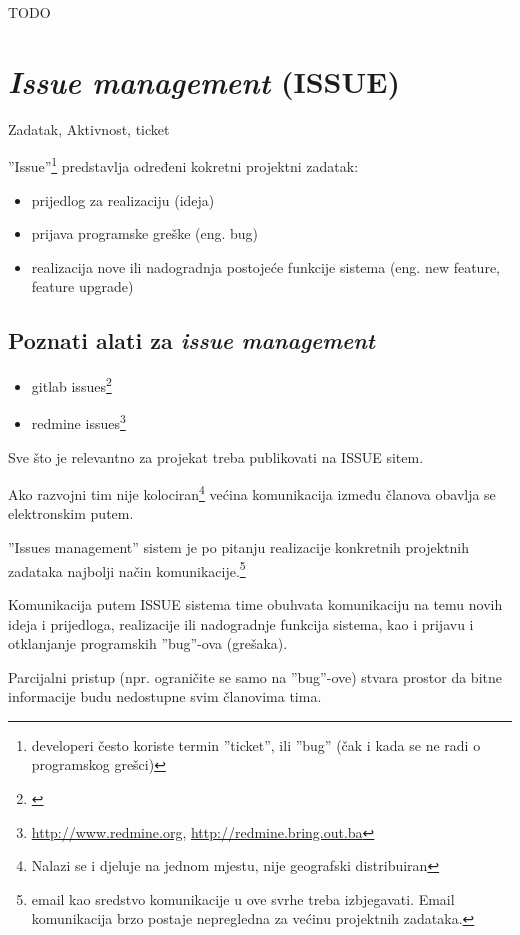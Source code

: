 \documentclass[lmodern, utf8, zavrsni]{fit}
\begin{document}
TODO

\section{\emph{Issue management} (ISSUE)}

Zadatak, Aktivnost, ticket

''Issue''\footnote{developeri često koriste termin ''ticket'', ili ''bug'' (čak i kada se ne radi o programskog grešci)} predstavlja određeni kokretni projektni zadatak:
\begin{itemize}
  \item prijedlog za realizaciju (ideja)
  \item prijava programske greške (eng. bug)
  \item realizacija nove ili nadogradnja postojeće funkcije sistema (eng. new feature, feature upgrade)
\end{itemize}

\subsection{Poznati alati za \emph{issue management}}

\begin{itemize}
  \item gitlab issues\footnote{\citep{agilegit}}
  \item redmine issues\footnote{\url{http://www.redmine.org}, \url{http://redmine.bring.out.ba}}
\end{itemize}

Sve što je relevantno za projekat treba publikovati na ISSUE sitem.

Ako razvojni tim nije kolociran\footnote{Nalazi se i djeluje na jednom mjestu, nije geografski distribuiran} većina komunikacija između članova obavlja se elektronskim putem.

''Issues management'' sistem je po pitanju realizacije konkretnih projektnih zadataka najbolji način komunikacije.\footnote{email kao sredstvo komunikacije u ove svrhe treba izbjegavati. Email komunikacija brzo postaje nepregledna za većinu projektnih zadataka.}

Komunikacija putem ISSUE sistema time obuhvata komunikaciju na temu novih ideja i prijedloga, realizacije ili nadogradnje funkcija sistema, kao i prijavu i otklanjanje programskih ''bug''-ova (grešaka).

Parcijalni pristup (npr. ograničite se samo na ''bug''-ove) stvara prostor da bitne informacije budu nedostupne svim članovima tima.
\end{document}
